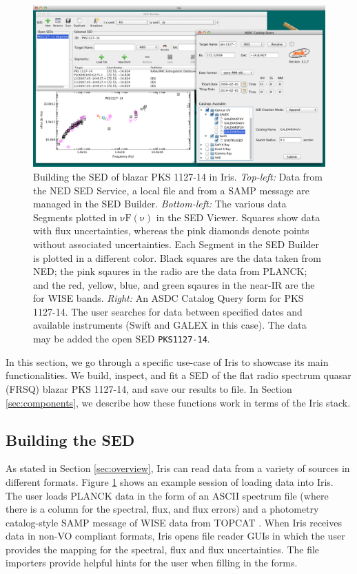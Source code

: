 \documentclass[5p]{elsarticle}
\begin{document}
\begin{figure}
\begin{center}
\includegraphics[height=0.3\textheight]{figures/built-in-visuals-loading1.png}
\caption{\textbf{\textit{\label{fig:load_data}} } Building the SED of blazar PKS 1127-14 in Iris. \textit{Top-left:} Data from the NED SED Service, a local file and from a SAMP message are managed in the SED Builder. \textit{Bottom-left:} The various data Segments plotted in $\mathrm{\nu F \left( \nu \right)}$ in the SED Viewer. Squares show data with flux uncertainties, whereas the pink diamonds denote points without associated uncertainties. Each Segment in the SED Builder is plotted in a different color. Black squares are the data taken from NED; the pink sqaures in the radio are the data from PLANCK; and the red, yellow, blue, and green sqaures in the near-IR are the for WISE bands. \textit{Right:} An ASDC Catalog Query form for PKS 1127-14. The user searches for data between specified dates and available instruments (Swift and GALEX in this case). The data may be added the open SED \texttt{PKS1127-14}.}
\end{center}
\end{figure}

In this section, we go through a specific use-case of Iris to showcase its main functionalities. We build, inspect, and fit a SED of the flat radio spectrum quasar (FRSQ) blazar PKS 1127-14, and save our results to file. In Section \ref{sec:components}, we describe how these functions work in terms of the Iris stack.

\subsection{Building the SED}

As stated in Section \ref{sec:overview}, Iris can read data from a variety of sources in different formats. Figure \ref{fig:load_data} shows an example session of loading data into Iris. The user loads PLANCK data in the form of an ASCII spectrum file (where there is a column for the spectral, flux, and flux errors) and a photometry catalog-style SAMP message of WISE data from TOPCAT \citep{2005ASPC..347...29T}. When Iris receives data in non-VO compliant formats, Iris opens file reader GUIs in which the user provides the mapping for the spectral, flux and flux uncertainties. The file importers provide helpful hints for the user when filling in the forms.
\end{document}
